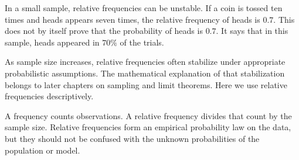 In a small sample, relative frequencies can be unstable. If a coin is tossed ten
times and heads appears seven times, the relative frequency of heads is \(0.7\).
This does not by itself prove that the probability of heads is \(0.7\). It says
that in this sample, heads appeared in \(70\%\) of the trials.

As sample size increases, relative frequencies often stabilize under appropriate
probabilistic assumptions. The mathematical explanation of that stabilization
belongs to later chapters on sampling and limit theorems. Here we use relative
frequencies descriptively.

\begin{summarybox}
A frequency counts observations. A relative frequency divides that count by the
sample size. Relative frequencies form an empirical probability law on the data,
but they should not be confused with the unknown probabilities of the population
or model.
\end{summarybox}
